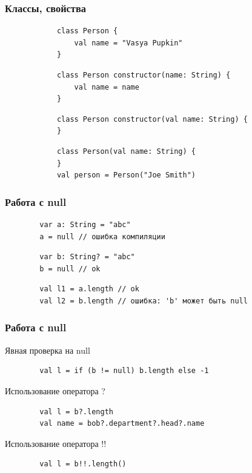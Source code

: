 \documentclass{beamer}
\begin{document}
\begin{frame}[fragile, t]
    \frametitle{Классы, свойства}
    \begin{overprint}
        \begin{verbatim}
            class Person {
                val name = "Vasya Pupkin"
            }
        \end{verbatim}

        \begin{verbatim}
            class Person constructor(name: String) {
                val name = name
            }
        \end{verbatim}

        \begin{verbatim}
            class Person constructor(val name: String) {
            }
        \end{verbatim}

        \begin{verbatim}
            class Person(val name: String) {
            }
            val person = Person("Joe Smith")
        \end{verbatim}
    \end{overprint}
\end{frame}

\begin{frame}[fragile, t]
    \frametitle{Работа с null}
    \begin{verbatim}
        var a: String = "abc"
        a = null // ошибка компиляции
    \end{verbatim}
    \begin{verbatim}
        var b: String? = "abc"
        b = null // ok
    \end{verbatim}
    \begin{verbatim}
        val l1 = a.length // ok
        val l2 = b.length // ошибка: 'b' может быть null
    \end{verbatim}
\end{frame}

\begin{frame}[fragile, t]
    \frametitle{Работа с null}
    Явная проверка на null
    \begin{verbatim}
        val l = if (b != null) b.length else -1
    \end{verbatim}

    Использование оператора ?
    \begin{verbatim}
        val l = b?.length
        val name = bob?.department?.head?.name
    \end{verbatim}

    Использование оператора !!
    \begin{verbatim}
        val l = b!!.length()
    \end{verbatim}
\end{frame}
\end{document}
